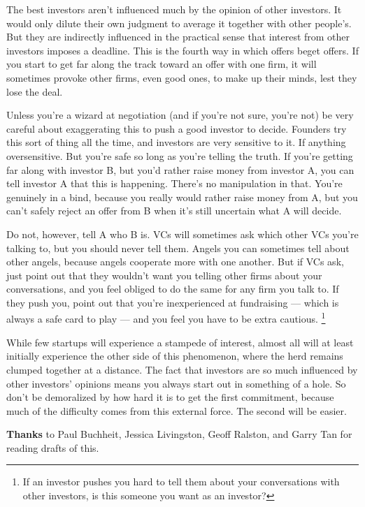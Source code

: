 \documentclass[12pt]{book}
\begin{document}
The best investors aren't influenced much by the opinion of other
investors. It would only dilute their own judgment to average it
together with other people's. But they are indirectly influenced in the
practical sense that interest from other investors imposes a deadline.
This is the fourth way in which offers beget offers. If you start to get
far along the track toward an offer with one firm, it will sometimes
provoke other firms, even good ones, to make up their minds, lest they
lose the deal.

Unless you're a wizard at negotiation (and if you're not sure, you're
not) be very careful about exaggerating this to push a good investor to
decide. Founders try this sort of thing all the time, and investors are
very sensitive to it. If anything oversensitive. But you're safe so long
as you're telling the truth. If you're getting far along with investor
B, but you'd rather raise money from investor A, you can tell investor A
that this is happening. There's no manipulation in that. You're
genuinely in a bind, because you really would rather raise money from A,
but you can't safely reject an offer from B when it's still uncertain
what A will decide.

Do not, however, tell A who B is. VCs will sometimes ask which other VCs
you're talking to, but you should never tell them. Angels you can
sometimes tell about other angels, because angels cooperate more with
one another. But if VCs ask, just point out that they wouldn't want you
telling other firms about your conversations, and you feel obliged to do
the same for any firm you talk to. If they push you, point out that
you're inexperienced at fundraising --- which is always a safe card to
play --- and you feel you have to be extra cautious.
\footnote{If an investor pushes you hard to tell them about your
conversations with other investors, is this someone you want as an
investor?}

While few startups will experience a stampede of interest, almost all
will at least initially experience the other side of this phenomenon,
where the herd remains clumped together at a distance. The fact that
investors are so much influenced by other investors' opinions means you
always start out in something of a hole. So don't be demoralized by how
hard it is to get the first commitment, because much of the difficulty
comes from this external force. The second will be easier.


\textbf{Thanks} to Paul Buchheit, Jessica Livingston, Geoff Ralston, and
Garry Tan for reading drafts of this.
\end{document}
